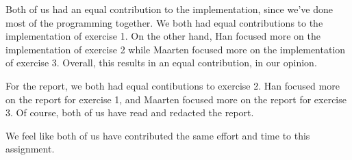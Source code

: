 \addtocounter{exerciseCount}{1} \noindent {} \par
Both of us had an equal contribution to the implementation, since we've done most of the programming together.
We both had equal contributions to the implementation of exercise 1.
On the other hand, Han focused more on the implementation of exercise 2 while Maarten focused more on the implementation of exercise 3.
Overall, this results in an equal contribution, in our opinion.

For the report, we both had equal contibutions to exercise 2.
Han focused more on the report for exercise 1, and Maarten focused more on the report for exercise 3.
Of course, both of us have read and redacted the report.

We feel like both of us have contributed the same effort and time to this assignment.